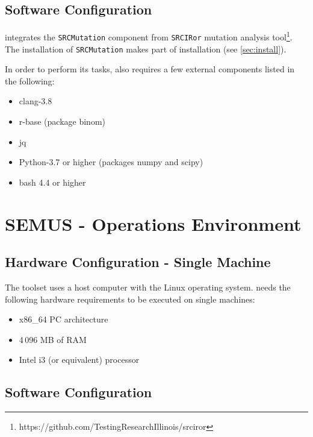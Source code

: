 \section{Software Configuration}

\MASS integrates the \texttt{SRCMutation} component from \texttt{SRCIRor} mutation analysis tool\footnote{https://github.com/TestingResearchIllinois/srciror}. The installation of \texttt{SRCMutation} makes part of \MASS installation (see \ref{sec:install}).

In order to perform its tasks, \MASS also requires a few external components listed in the following:

\begin{itemize}
	\item clang-3.8
	\item r-base (package binom)
	\item jq
	\item Python-3.7 or higher (packages numpy and scipy)
	\item bash 4.4 or higher
\end{itemize}



\chapter{SEMUS - Operations Environment}
\label{chapter:semus:operationsEnv}

\section{Hardware Configuration - Single Machine}

The \SEMUS toolset uses a host computer with the Linux operating system. \SEMUS needs the following hardware requirements to be executed on single machines:

\begin{itemize}
	\item x86\_64 PC architecture
	\item 4\,096 MB of RAM
	\item Intel i3 (or equivalent) processor
\end{itemize}


\section{Software Configuration}

